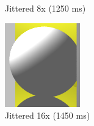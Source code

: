 \begin{figure}[H]
    \caption{Jittered 8x (1250 ms)}
\endminipage\hfill
{}
    \centering
    \includegraphics[width=\linewidth]{img/antialiasing/sto16x.png}
    \caption{Jittered 16x (1450 ms)}
\endminipage\hfill
\end{figure}


